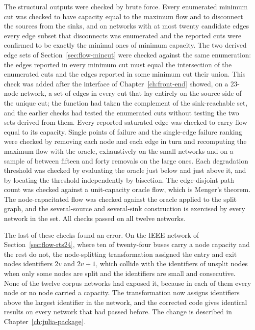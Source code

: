 \documentclass[12pt]{report}
\begin{document}
The structural outputs were checked by brute force. Every enumerated minimum cut was checked
to have capacity equal to the maximum flow and to disconnect the sources from the sinks, and
on networks with at most twenty candidate edges every edge subset that disconnects was
enumerated and the reported cuts were confirmed to be exactly the minimal ones of minimum
capacity. The two derived edge sets of Section~\ref{sec:flow-mincut} were checked against
the same enumeration: the edges reported in every minimum cut must equal the intersection of
the enumerated cuts and the edges reported in some minimum cut their union. This check was
added after the interface of Chapter~\ref{ch:front-end} showed, on a 23-node network, a set
of edges in every cut that lay entirely on the source side of the unique cut; the function
had taken the complement of the sink-reachable set, and the earlier checks had tested the
enumerated cuts without testing the two sets derived from them. Every reported saturated edge was checked to carry flow equal to its capacity.
Single points of failure and the single-edge failure ranking were checked by removing each
node and each edge in turn and recomputing the maximum flow with the oracle, exhaustively on
the small networks and on a sample of between fifteen and forty removals on the large ones.
Each degradation threshold was checked by evaluating the oracle just below and just above it,
and by locating the threshold independently by bisection. The edge-disjoint path count was
checked against a unit-capacity oracle flow, which is Menger's theorem. The node-capacitated
flow was checked against the oracle applied to the split graph, and the several-source and
several-sink construction is exercised by every network in the set. All checks passed on all
twelve networks.

The last of these checks found an error. On the IEEE network of Section~\ref{sec:flow-rts24},
where ten of twenty-four buses carry a node capacity and the rest do not, the node-splitting
transformation assigned the entry and exit nodes identifiers $2v$ and $2v+1$, which collide
with the identifiers of unsplit nodes when only some nodes are split and the identifiers are
small and consecutive. None of the twelve corpus networks had exposed it, because in each of
them every node or no node carried a capacity. The transformation now assigns identifiers
above the largest identifier in the network, and the corrected code gives identical results on
every network that had passed before. The change is described in Chapter~\ref{ch:julia-package}.
\end{document}
